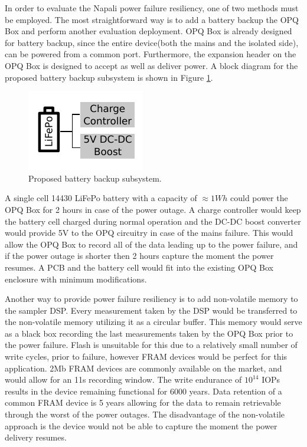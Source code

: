 In order to evaluate the Napali power failure resiliency, one of two methods must be employed.
The most straightforward way is to add a battery backup the OPQ Box and perform another evaluation deployment.
OPQ Box is already designed for battery backup, since the entire device(both the mains and the isolated side), can be powered from a common port.
Furthermore, the expansion header on the OPQ Box is designed to accept as well as deliver power.
A block diagram for the proposed battery backup subsystem is shown in Figure \ref{fig:conc:bat}.
\begin{figure}[ht!]
    \centering
    \includegraphics[width=0.5\linewidth]{img/conclusions/battery.pdf}
    \caption{Proposed battery backup subsystem.}
    \label{fig:conc:bat}
\end{figure}
A single cell 14430 LiFePo battery with a capacity of $\approx 1Wh$ could power the OPQ Box for 2 hours in case of the power outage.
A charge controller would keep the battery cell charged during normal operation and the DC-DC boost converter would provide 5V to the OPQ circuitry in case of the mains failure.
This would allow the OPQ Box to record all of the data leading up to the power failure, and if the power outage is shorter then 2 hours capture the moment the power resumes.
A PCB and the battery cell would fit into the existing OPQ Box enclosure with minimum modifications.

Another way to provide power failure resiliency is to add non-volatile memory to the sampler DSP.
Every measurement taken by the DSP would be transferred to the non-volatile memory utilizing it as a circular buffer.
This memory would serve as a black box recording the last measurements taken by the OPQ Box prior to the power failure.
Flash is unsuitable for this due to a relatively small number of write cycles, prior to failure, however FRAM devices would be perfect for this application.
2Mb FRAM devices are commonly available on the market, and would allow for an 11s recording window.
The write endurance of $10^{14}$ IOPs results in the device remaining functional for 6000 years.
Data retention of a common FRAM device is 5 years allowing for the data to remain retrievable through the worst of the power outages.
The disadvantage of the non-volatile approach is the device would not be able to capture the moment the power delivery resumes.

